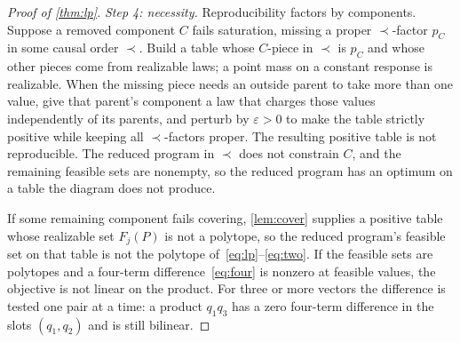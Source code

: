 \begin{proof}[Proof of \cref{thm:lp}]
\emph{Step 4: necessity.} Reproducibility factors by components. Suppose a removed component $C$ fails saturation, missing a proper $\prec$-factor $p_C$ in some causal order $\prec$. Build a table whose $C$-piece in $\prec$ is $p_C$ and whose other pieces come from realizable laws; a point mass on a constant response is realizable. When the missing piece needs an outside parent to take more than one value, give that parent's component a law that charges those values independently of its parents, and perturb by $\varepsilon>0$ to make the table strictly positive while keeping all $\prec$-factors proper. The resulting positive table is not reproducible. The reduced program in $\prec$ does not constrain $C$, and the remaining feasible sets are nonempty, so the reduced program has an optimum on a table the diagram does not produce.

If some remaining component fails covering, \cref{lem:cover} supplies a positive table whose realizable set $F_j(P)$ is not a polytope, so the reduced program's feasible set on that table is not the polytope of~\eqref{eq:lp}--\eqref{eq:two}. If the feasible sets are polytopes and a four-term difference~\eqref{eq:four} is nonzero at feasible values, the objective is not linear on the product. For three or more vectors the difference is tested one pair at a time: a product $q_1 q_3$ has a zero four-term difference in the slots $(q_1,q_2)$ and is still bilinear.
\end{proof}


